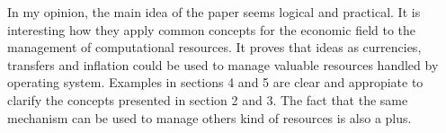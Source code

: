 \documentclass[a4paper,10pt]{scrartcl}
\begin{document}
In my opinion, the main idea of the paper seems logical and practical.  It is interesting how they apply common concepts for the economic field to the management of computational resources.  It proves that ideas as currencies, transfers and inflation could be used to manage valuable resources handled by operating system.  Examples in sections 4 and 5 are clear and appropiate to clarify the concepts presented in section 2 and 3.  The fact that the same mechanism can be used to manage others kind of resources is also a plus.  

\end{document}
